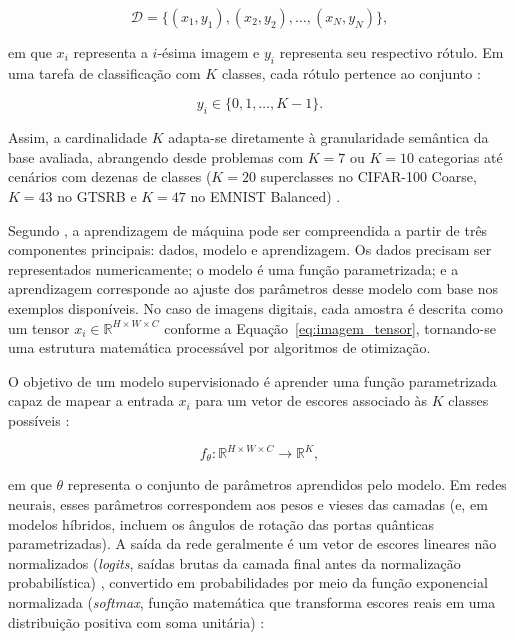 \documentclass[
    12pt,
    openright,
    oneside,
    a4paper,
    english,
    brazil
]{abntex2}
\begin{document}
\begin{equation}
\label{eq:dataset_supervisionado}
\mathcal{D} =
\{(x_1,y_1),(x_2,y_2),\ldots,(x_N,y_N)\},
\end{equation}

em que \(x_i\) representa a \(i\)-ésima imagem e \(y_i\) representa seu respectivo rótulo. Em uma tarefa de classificação com \(K\) classes, cada rótulo pertence ao conjunto \cite{deisenroth2020mathematics}:

\begin{equation}
\label{eq:rotulo_discreto}
y_i \in \{0,1,\ldots,K-1\}.
\end{equation}

Assim, a cardinalidade \(K\) adapta-se diretamente à granularidade semântica da base avaliada, abrangendo desde problemas com \(K=7\) ou \(K=10\) categorias até cenários com dezenas de classes (\(K=20\) superclasses no CIFAR-100 Coarse, \(K=43\) no GTSRB e \(K=47\) no EMNIST Balanced) \cite{deisenroth2020mathematics}.

Segundo , a aprendizagem de máquina pode ser compreendida a partir de três componentes principais: dados, modelo e aprendizagem. Os dados precisam ser representados numericamente; o modelo é uma função parametrizada; e a aprendizagem corresponde ao ajuste dos parâmetros desse modelo com base nos exemplos disponíveis. No caso de imagens digitais, cada amostra é descrita como um tensor \(x_i \in \mathbb{R}^{H \times W \times C}\) conforme a Equação~\eqref{eq:imagem_tensor}, tornando-se uma estrutura matemática processável por algoritmos de otimização.

O objetivo de um modelo supervisionado é aprender uma função parametrizada capaz de mapear a entrada \(x_i\) para um vetor de escores associado às \(K\) classes possíveis \cite{deisenroth2020mathematics,goodfellow2016deep}:

\begin{equation}
\label{eq:mapeamento_modelo}
f_{\theta}: \mathbb{R}^{H \times W \times C} \rightarrow \mathbb{R}^{K},
\end{equation}

em que \(\theta\) representa o conjunto de parâmetros aprendidos pelo modelo. Em redes neurais, esses parâmetros correspondem aos pesos e vieses das camadas (e, em modelos híbridos, incluem os ângulos de rotação das portas quânticas parametrizadas). A saída da rede geralmente é um vetor de escores lineares não normalizados (\textit{logits}, saídas brutas da camada final antes da normalização probabilística) \cite{goodfellow2016deep}, convertido em probabilidades por meio da função exponencial normalizada (\textit{softmax}, função matemática que transforma escores reais em uma distribuição positiva com soma unitária) \cite{goodfellow2016deep,deisenroth2020mathematics}:
\end{document}
